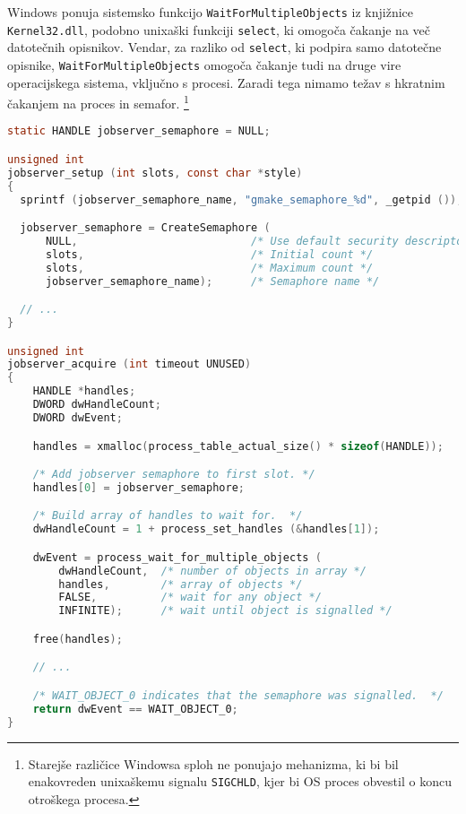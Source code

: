 \documentclass[notitlepage]{report}
\begin{document}
Windows ponuja sistemsko funkcijo \verb|WaitForMultipleObjects| iz
knjižnice \verb|Kernel32.dll|, podobno unixaški funkciji
\verb|select|, ki omogoča čakanje na več datotečnih opisnikov. Vendar,
za razliko od \verb|select|, ki podpira samo datotečne opisnike,
\verb|WaitForMultipleObjects| omogoča čakanje tudi na druge vire
operacijskega sistema, vključno s procesi. Zaradi tega nimamo težav s
hkratnim čakanjem na proces in semafor. \footnote{Starejše različice
  Windowsa sploh ne ponujajo mehanizma, ki bi bil enakovreden
  unixaškemu signalu \verb|SIGCHLD|, kjer bi OS proces obvestil o
  koncu otroškega procesa.}

\begin{lstlisting}[language=C, basicstyle=\sffamily]
static HANDLE jobserver_semaphore = NULL;

unsigned int
jobserver_setup (int slots, const char *style)
{
  sprintf (jobserver_semaphore_name, "gmake_semaphore_%d", _getpid ());

  jobserver_semaphore = CreateSemaphore (
      NULL,                           /* Use default security descriptor */
      slots,                          /* Initial count */
      slots,                          /* Maximum count */
      jobserver_semaphore_name);      /* Semaphore name */

  // ...
}

unsigned int
jobserver_acquire (int timeout UNUSED)
{
    HANDLE *handles;
    DWORD dwHandleCount;
    DWORD dwEvent;

    handles = xmalloc(process_table_actual_size() * sizeof(HANDLE));

    /* Add jobserver semaphore to first slot. */
    handles[0] = jobserver_semaphore;

    /* Build array of handles to wait for.  */
    dwHandleCount = 1 + process_set_handles (&handles[1]);

    dwEvent = process_wait_for_multiple_objects (
        dwHandleCount,  /* number of objects in array */
        handles,        /* array of objects */
        FALSE,          /* wait for any object */
        INFINITE);      /* wait until object is signalled */

    free(handles);

    // ...

    /* WAIT_OBJECT_0 indicates that the semaphore was signalled.  */
    return dwEvent == WAIT_OBJECT_0;
}
\end{lstlisting}


\end{document}
